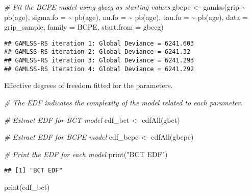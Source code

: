\documentclass[
]{article}
\newenvironment{Shaded}{\begin{snugshade}}{\end{snugshade}}
\newcommand{\AttributeTok}[1]{\textcolor[rgb]{0.77,0.63,0.00}{#1}}
\newcommand{\CommentTok}[1]{\textcolor[rgb]{0.56,0.35,0.01}{\textit{#1}}}
\newcommand{\FunctionTok}[1]{\textcolor[rgb]{0.00,0.00,0.00}{#1}}
\newcommand{\NormalTok}[1]{#1}
\newcommand{\OtherTok}[1]{\textcolor[rgb]{0.56,0.35,0.01}{#1}}
\newcommand{\SpecialCharTok}[1]{\textcolor[rgb]{0.00,0.00,0.00}{#1}}
\newcommand{\StringTok}[1]{\textcolor[rgb]{0.31,0.60,0.02}{#1}}
\begin{document}
\begin{Shaded}
\begin{Highlighting}[]
\CommentTok{\# Fit the BCPE model using gbccg as starting values}
\NormalTok{gbcpe }\OtherTok{\textless{}{-}} \FunctionTok{gamlss}\NormalTok{(grip }\SpecialCharTok{\textasciitilde{}} \FunctionTok{pb}\NormalTok{(age),}
                \AttributeTok{sigma.fo =} \SpecialCharTok{\textasciitilde{}} \FunctionTok{pb}\NormalTok{(age),}
                \AttributeTok{nu.fo =} \SpecialCharTok{\textasciitilde{}} \FunctionTok{pb}\NormalTok{(age),}
                \AttributeTok{tau.fo =} \SpecialCharTok{\textasciitilde{}} \FunctionTok{pb}\NormalTok{(age),}
                \AttributeTok{data =}\NormalTok{ grip\_sample,}
                \AttributeTok{family =}\NormalTok{ BCPE,}
                \AttributeTok{start.from =}\NormalTok{ gbccg)}
\end{Highlighting}
\end{Shaded}

\begin{verbatim}
## GAMLSS-RS iteration 1: Global Deviance = 6241.603 
## GAMLSS-RS iteration 2: Global Deviance = 6241.32 
## GAMLSS-RS iteration 3: Global Deviance = 6241.293 
## GAMLSS-RS iteration 4: Global Deviance = 6241.292
\end{verbatim}

Effective degrees of freedom fitted for the parameters.

\begin{Shaded}
\begin{Highlighting}[]
\CommentTok{\# The EDF indicates the complexity of the model related to each parameter.}

\CommentTok{\# Extract EDF for BCT model}
\NormalTok{edf\_bct }\OtherTok{\textless{}{-}} \FunctionTok{edfAll}\NormalTok{(gbct)}

\CommentTok{\# Extract EDF for BCPE model}
\NormalTok{edf\_bcpe }\OtherTok{\textless{}{-}} \FunctionTok{edfAll}\NormalTok{(gbcpe)}

\CommentTok{\# Print the EDF for each model}
\FunctionTok{print}\NormalTok{(}\StringTok{"BCT EDF"}\NormalTok{)}
\end{Highlighting}
\end{Shaded}

\begin{verbatim}
## [1] "BCT EDF"
\end{verbatim}

\begin{Shaded}
\begin{Highlighting}[]
\FunctionTok{print}\NormalTok{(edf\_bct)}
\end{Highlighting}
\end{Shaded}
\end{document}
